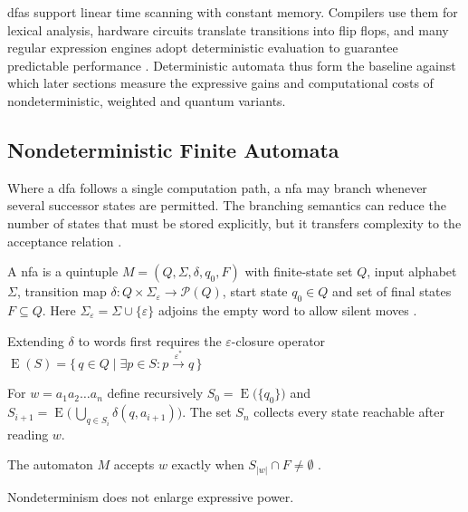 \glspl{dfa} support linear time scanning with constant memory.
Compilers use them for lexical analysis, hardware circuits translate
transitions into flip flops, and many regular expression engines adopt
deterministic evaluation to guarantee predictable performance
\cite{aho1974design}.  Deterministic automata thus form the
baseline against which later sections measure the expressive gains and
computational costs of nondeterministic, weighted and quantum variants.

\subsection{Nondeterministic Finite Automata}\label{subsec:nfa}

Where a \gls{dfa} follows a single computation path, a \gls{nfa} may
branch whenever several successor states are permitted.  The branching
semantics can reduce the number of states that must be stored
explicitly, but it transfers complexity to the acceptance relation
\cite{rabin1959finite}.

\begin{definition}\label{def:nfa}
A \gls{nfa} is a quintuple
$M=(Q,\Sigma,\delta,q_{0},F)$ with
finite-state set $Q$, input alphabet $\Sigma$, transition map
$\delta\colon Q{\times}\Sigma_{\varepsilon}\to\mathcal{P}(Q)$,
start state $q_{0}\in Q$ and set of final states $F\subseteq Q$.
Here $\Sigma_{\varepsilon}=\Sigma\cup\{\varepsilon\}$ adjoins the empty
word to allow silent moves \cite{rabin1959finite}.
\end{definition}

Extending $\delta$ to words first requires the
$\varepsilon$-closure operator
$\operatorname{E}(S)=
  \bigl\{\,q\in Q\mid
          \exists p\in S\colon
          p\xrightarrow{\varepsilon^{\ast}} q\,\bigr\}$

For $w=a_{1}a_{2}\dots a_{n}$ define recursively  
$S_{0}=\operatorname{E}\bigl(\{q_{0}\}\bigr)$ and  
$S_{i+1}=  
\operatorname{E}\bigl(\,\bigcup_{q\in S_{i}}\delta(q,a_{i+1})\bigr)$.
The set $S_{n}$ collects every state reachable after reading $w$.

\begin{lemma}\label{lem:nfa-accept}
The automaton $M$ accepts $w$ exactly when
$S_{|w|}\cap F\neq\emptyset$ \cite{hopcroft2001introduction}.
\end{lemma}

Nondeterminism does not enlarge expressive power.

